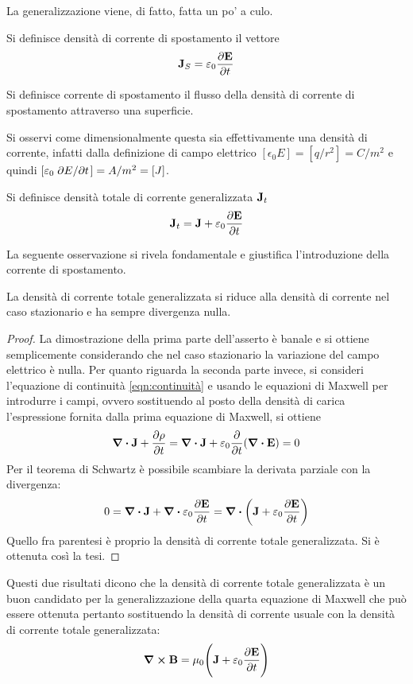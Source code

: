 La generalizzazione viene, di fatto, fatta un po' a culo.
\begin{defn}
    Si definisce densità di corrente di spostamento il vettore
    \[
        \vb{J}_S=\varepsilon_0\pdv{\vb{E}}{t}
    \]
\end{defn}
\begin{defn}
    Si definisce corrente di spostamento il flusso della densità di corrente di spostamento attraverso una superficie.
\end{defn}
Si osservi come dimensionalmente questa sia effettivamente una densità di corrente, infatti dalla definizione di campo
elettrico $[\epsilon_0 E]=[q/r^2]=C/m^2$ e quindi $[\varepsilon_0\pdv*{E}{t}]=A/m^2=[J]$.
\begin{defn}
    Si definisce densità totale di corrente generalizzata $\vb{J}_t$
    \[
        \vb{J}_t=\vb{J}+\varepsilon_0\pdv{\vb{E}}{t}
    \]
\end{defn}
La seguente osservazione si rivela fondamentale e giustifica l'introduzione della corrente di spostamento.
\begin{obs}
    La densità di corrente totale generalizzata si riduce alla densità di corrente nel caso stazionario e ha sempre divergenza nulla.
\end{obs}
\begin{proof}
    La dimostrazione della prima parte dell'asserto è banale e si ottiene semplicemente considerando che nel caso stazionario
    la variazione del campo elettrico è nulla. Per quanto riguarda la seconda parte invece, si consideri l'equazione di continuità
    \eqref{eqn:continuità} e usando le equazioni di Maxwell per introdurre i campi, ovvero sostituendo al posto della densità di carica
    l'espressione fornita dalla prima equazione di Maxwell, si ottiene
    \[
        \div{\vb{J}}+\pdv{\rho}{t}=\div{\vb{J}}+\varepsilon_0\pdv{t}(\div{\vb{E}})=0
    \]
    Per il teorema di Schwartz è possibile scambiare la derivata parziale con la divergenza:
    \[
        0=\div{\vb{J}}+\div{\varepsilon_0\pdv{\vb{E}}{t}}=\div(\vb{J}+\varepsilon_0\pdv{\vb{E}}{t})
    \]
    Quello fra parentesi è proprio la densità di corrente totale generalizzata. Si è ottenuta così la tesi.
\end{proof}
Questi due risultati dicono che la densità di corrente totale generalizzata è un buon candidato per
la generalizzazione della quarta equazione di Maxwell che può essere ottenuta pertanto sostituendo
la densità di corrente usuale con la densità di corrente totale generalizzata:
\begin{equation}
    \curl{\vb{B}}=\mu_0\Biggl(\vb{J}+\varepsilon_0\pdv{\vb{E}}{t} \Biggr)
\end{equation}

